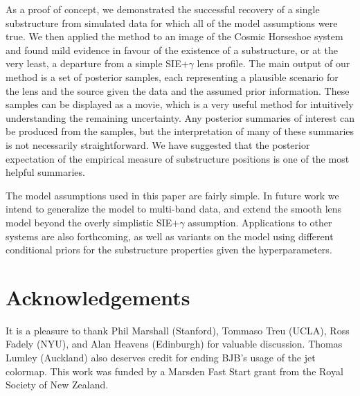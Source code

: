\documentclass[useAMS,usenatbib]{mn2e}
\begin{document}
As a proof of concept, we demonstrated the successful recovery of a single
substructure from simulated data for which all of the model assumptions were
true. We then applied the method to an image of the Cosmic Horseshoe system
and found mild evidence in favour of the existence of a substructure, or at
the very least, a departure from a simple SIE+$\gamma$ lens profile. The
main output of our method is a set of posterior samples, each representing
a plausible scenario for the lens and the source given the data
and the assumed prior information. These samples can be displayed as a movie,
which is a very useful method for intuitively understanding the remaining
uncertainty. Any posterior summaries of interest can be
produced from the samples, but the interpretation of many of these summaries
is not necessarily straightforward. We have suggested that the
posterior expectation of the empirical measure of substructure positions is
one of the most helpful summaries.

The model assumptions used in this paper are fairly simple. In future work we
intend to generalize the model to multi-band data, and extend the
smooth lens model beyond the overly simplistic
SIE+$\gamma$ assumption. Applications
to other systems are also forthcoming, as well as variants on the model using
different conditional priors for the substructure properties given the
hyperparameters.

\section*{Acknowledgements}
It is a pleasure to thank Phil Marshall (Stanford), Tommaso Treu (UCLA),
Ross Fadely (NYU), and Alan Heavens (Edinburgh)
for valuable discussion. Thomas Lumley (Auckland) also deserves credit for
ending BJB's usage of the jet colormap.
This work was funded by a Marsden Fast Start grant from the Royal Society of
New Zealand.
\end{document}
